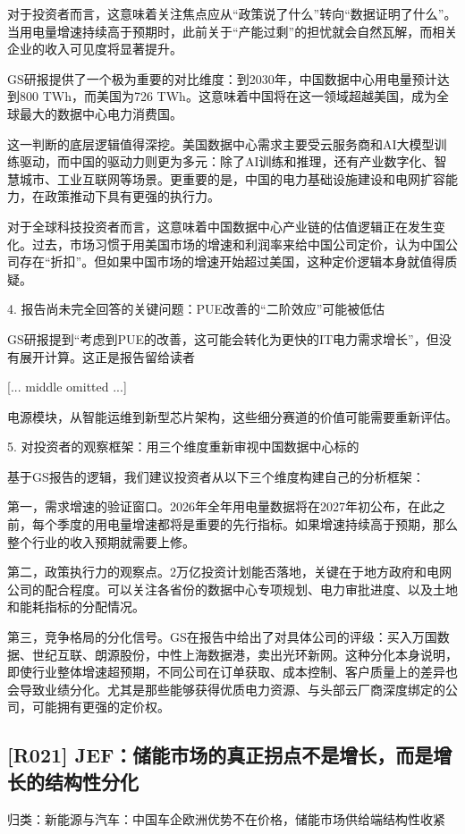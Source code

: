 \documentclass[11pt]{ctexart}
\begin{document}
对于投资者而言，这意味着关注焦点应从“政策说了什么”转向“数据证明了什么”。当用电量增速持续高于预期时，此前关于“产能过剩”的担忧就会自然瓦解，而相关企业的收入可见度将显著提升。

GS研报提供了一个极为重要的对比维度：到2030年，中国数据中心用电量预计达到800 TWh，而美国为726 TWh。这意味着中国将在这一领域超越美国，成为全球最大的数据中心电力消费国。

这一判断的底层逻辑值得深挖。美国数据中心需求主要受云服务商和AI大模型训练驱动，而中国的驱动力则更为多元：除了AI训练和推理，还有产业数字化、智慧城市、工业互联网等场景。更重要的是，中国的电力基础设施建设和电网扩容能力，在政策推动下具有更强的执行力。

对于全球科技投资者而言，这意味着中国数据中心产业链的估值逻辑正在发生变化。过去，市场习惯于用美国市场的增速和利润率来给中国公司定价，认为中国公司存在“折扣”。但如果中国市场的增速开始超过美国，这种定价逻辑本身就值得质疑。

4. 报告尚未完全回答的关键问题：PUE改善的“二阶效应”可能被低估

GS研报提到“考虑到PUE的改善，这可能会转化为更快的IT电力需求增长”，但没有展开计算。这正是报告留给读者

[... middle omitted ...]

电源模块，从智能运维到新型芯片架构，这些细分赛道的价值可能需要重新评估。

5. 对投资者的观察框架：用三个维度重新审视中国数据中心标的

基于GS报告的逻辑，我们建议投资者从以下三个维度构建自己的分析框架：

第一，需求增速的验证窗口。2026年全年用电量数据将在2027年初公布，在此之前，每个季度的用电量增速都将是重要的先行指标。如果增速持续高于预期，那么整个行业的收入预期就需要上修。

第二，政策执行力的观察点。2万亿投资计划能否落地，关键在于地方政府和电网公司的配合程度。可以关注各省份的数据中心专项规划、电力审批进度、以及土地和能耗指标的分配情况。

第三，竞争格局的分化信号。GS在报告中给出了对具体公司的评级：买入万国数据、世纪互联、朗源股份，中性上海数据港，卖出光环新网。这种分化本身说明，即使行业整体增速超预期，不同公司在订单获取、成本控制、客户质量上的差异也会导致业绩分化。尤其是那些能够获得优质电力资源、与头部云厂商深度绑定的公司，可能拥有更强的定价权。

\subsection{[R021] JEF：储能市场的真正拐点不是增长，而是增长的结构性分化}
{\small\color{refgray}归类：新能源与汽车：中国车企欧洲优势不在价格，储能市场供给端结构性收紧}
\end{document}
